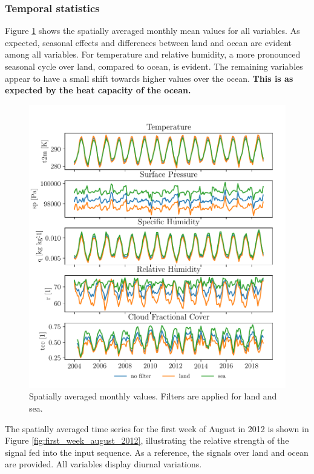 \subsubsection{Temporal statistics}
Figure \ref{fig:monthly_mean_ts_vars} shows the spatially averaged monthly mean values for all variables. As expected, seasonal effects and differences between land and ocean are evident among all variables. For temperature and relative humidity, a more pronounced seasonal cycle over land, compared to ocean, is evident. The remaining variables appear to have a small shift towards higher values over the ocean. \textbf{This is as expected by the heat capacity of the ocean.}
\begin{figure}[ht]
    \centering
    \includegraphics{python_figs/monthly_means.pdf}
    \caption{Spatially averaged monthly values. Filters are applied for land and sea.}
    \label{fig:monthly_mean_ts_vars}
\end{figure}

The spatially averaged time series for the first week of August in 2012 is shown in Figure \ref{fig:first_week_august_2012}, illustrating the relative strength of the signal fed into the input sequence. As a reference, the signals over land and ocean are provided. All variables display diurnal variations. 

